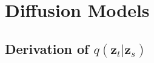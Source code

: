 \documentclass[ oneside,%
                    author={George Herbert},
                    degree={MSci},
                     title={Video Diffusion Models for Climate Simulations},
                  subtitle={}]{dissertation}
\begin{document}

%
%
%

\backmatter





\appendix

\chapter{Diffusion Models}
\label{appx:diffusion}

\section{Derivation of $q(\mathbf{z}_t|\mathbf{z}_s)$}
\label{appx:diffusion_q_z_t_given_z_s}
\end{document}
